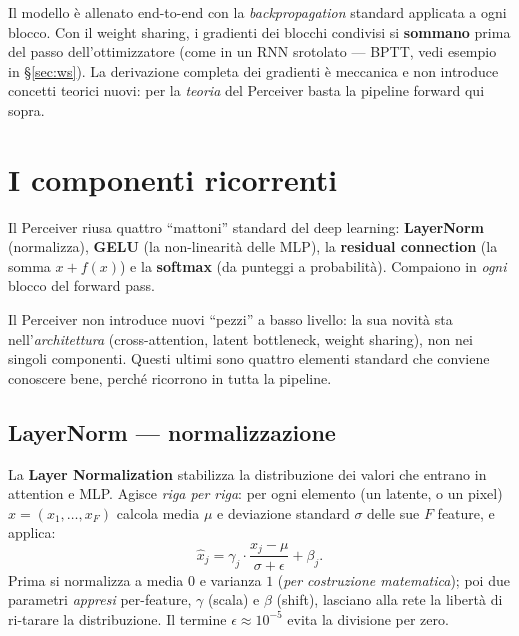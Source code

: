 \documentclass[11pt]{article}
\newcommand{\curstage}{0}
\newcommand{\stage}[1]{\gdef\curstage{#1}}
\begin{document}
\begin{notabox}[title={\textbf{E il backward pass?}}]
Il modello è allenato end-to-end con la \emph{backpropagation} standard applicata a ogni blocco. Con il weight sharing, i gradienti dei blocchi condivisi si \textbf{sommano} prima del passo dell'ottimizzatore (come in un RNN srotolato --- BPTT, vedi esempio in \S\ref{sec:ws}). La derivazione completa dei gradienti è meccanica e non introduce concetti teorici nuovi: per la \emph{teoria} del Perceiver basta la pipeline forward qui sopra.
\end{notabox}

\section{I componenti ricorrenti}
\stage{0}

\begin{brevebox}[title={\textbf{In breve}}]
Il Perceiver riusa quattro ``mattoni'' standard del deep learning: \textbf{LayerNorm} (normalizza), \textbf{GELU} (la non-linearità delle MLP), la \textbf{residual connection} (la somma $x + f(x)$) e la \textbf{softmax} (da punteggi a probabilità). Compaiono in \emph{ogni} blocco del forward pass.
\end{brevebox}

Il Perceiver non introduce nuovi ``pezzi'' a basso livello: la sua novità sta nell'\emph{architettura} (cross-attention, latent bottleneck, weight sharing), non nei singoli componenti. Questi ultimi sono quattro elementi standard che conviene conoscere bene, perché ricorrono in tutta la pipeline.

\subsection{LayerNorm --- normalizzazione}

La \textbf{Layer Normalization} stabilizza la distribuzione dei valori che entrano in attention e MLP. Agisce \emph{riga per riga}: per ogni elemento (un latente, o un pixel) $x = (x_1,\ldots,x_F)$ calcola media $\mu$ e deviazione standard $\sigma$ delle sue $F$ feature, e applica:
\[
\hat x_j = \gamma_j \cdot \frac{x_j - \mu}{\sigma + \epsilon} + \beta_j .
\]
Prima si normalizza a media $0$ e varianza $1$ (\emph{per costruzione matematica}); poi due parametri \emph{appresi} per-feature, $\gamma$ (scala) e $\beta$ (shift), lasciano alla rete la libertà di ri-tarare la distribuzione. Il termine $\epsilon \approx 10^{-5}$ evita la divisione per zero.
\end{document}
